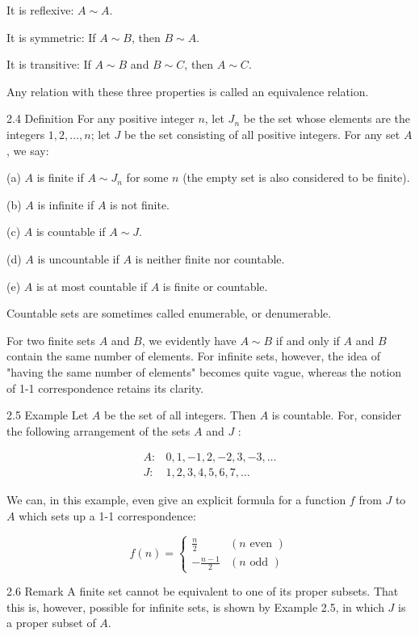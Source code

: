 \documentclass[10pt]{article}
\begin{document}
It is reflexive: $A \sim A$.

It is symmetric: If $A \sim B$, then $B \sim A$.

It is transitive: If $A \sim B$ and $B \sim C$, then $A \sim C$.

Any relation with these three properties is called an equivalence relation.

2.4 Definition For any positive integer $n$, let $J_{n}$ be the set whose elements are the integers $1,2, \ldots, n$; let $J$ be the set consisting of all positive integers. For any set $A$, we say:

(a) $A$ is finite if $A \sim J_{n}$ for some $n$ (the empty set is also considered to be finite).

(b) $A$ is infinite if $A$ is not finite.

(c) $A$ is countable if $A \sim J$.

(d) $A$ is uncountable if $A$ is neither finite nor countable.

(e) $A$ is at most countable if $A$ is finite or countable.

Countable sets are sometimes called enumerable, or denumerable.

For two finite sets $A$ and $B$, we evidently have $A \sim B$ if and only if $A$ and $B$ contain the same number of elements. For infinite sets, however, the idea of "having the same number of elements" becomes quite vague, whereas the notion of 1-1 correspondence retains its clarity.

2.5 Example Let $A$ be the set of all integers. Then $A$ is countable. For, consider the following arrangement of the sets $A$ and $J$ :

$$
\begin{array}{ll}
A: & 0,1,-1,2,-2,3,-3, \ldots \\
J: & 1,2,3,4,5,6,7, \ldots
\end{array}
$$

We can, in this example, even give an explicit formula for a function $f$ from $J$ to $A$ which sets up a 1-1 correspondence:

$$
f(n)= \begin{cases}\frac{n}{2} & (n \text { even }) \\ -\frac{n-1}{2} & (n \text { odd })\end{cases}
$$

2.6 Remark A finite set cannot be equivalent to one of its proper subsets. That this is, however, possible for infinite sets, is shown by Example 2.5, in which $J$ is a proper subset of $A$.
\end{document}
